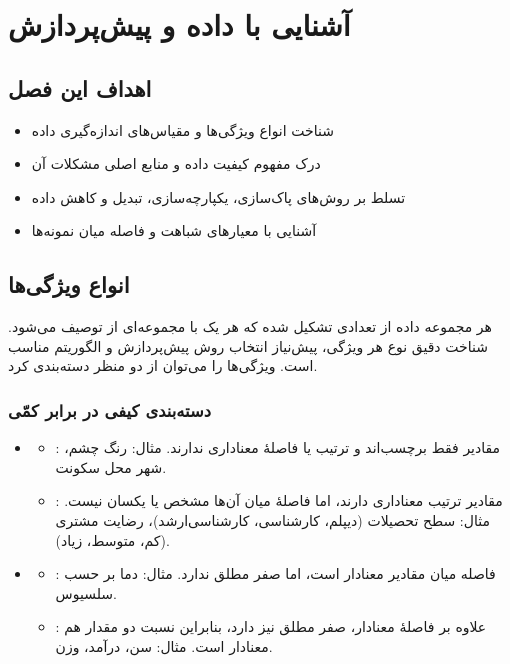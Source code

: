\chapter{آشنایی با داده و پیش‌پردازش}
\label{ch:data}

\section*{اهداف این فصل}
\begin{itemize}
    \item شناخت انواع ویژگی‌ها و مقیاس‌های اندازه‌گیری داده
    \item درک مفهوم کیفیت داده و منابع اصلی مشکلات آن
    \item تسلط بر روش‌های پاک‌سازی، یکپارچه‌سازی، تبدیل و کاهش داده
    \item آشنایی با معیارهای شباهت و فاصله میان نمونه‌ها
\end{itemize}

\section{انواع ویژگی‌ها}
\label{sec:attribute-types}

هر مجموعه داده از تعدادی 
تشکیل شده که هر یک با مجموعه‌ای از 
توصیف می‌شود. شناخت دقیق نوع هر ویژگی، پیش‌نیاز انتخاب روش پیش‌پردازش و الگوریتم
مناسب است. ویژگی‌ها را می‌توان از دو منظر دسته‌بندی کرد.

\subsection{دسته‌بندی کیفی در برابر کمّی}

\begin{itemize}
    \item {}
    \begin{itemize}
        \item {}: مقادیر فقط برچسب‌اند و ترتیب یا فاصلهٔ
              معناداری ندارند. مثال: رنگ چشم، شهر محل سکونت.
        \item {}: مقادیر ترتیب معناداری دارند، اما فاصلهٔ
              میان آن‌ها مشخص یا یکسان نیست. مثال: سطح تحصیلات (دیپلم، کارشناسی،
              کارشناسی‌ارشد)، رضایت مشتری (کم، متوسط، زیاد).
    \end{itemize}
    \item {}
    \begin{itemize}
        \item {}: فاصله میان مقادیر معنادار است، اما
              صفر مطلق ندارد. مثال: دما بر حسب سلسیوس.
        \item {}: علاوه بر فاصلهٔ معنادار، صفر مطلق نیز دارد،
              بنابراین نسبت دو مقدار هم معنادار است. مثال: سن، درآمد، وزن.
    \end{itemize}
\end{itemize}

